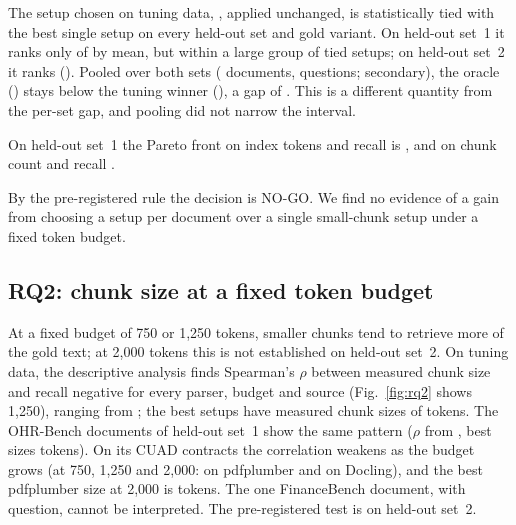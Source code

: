 The setup chosen on tuning data, \RQoneTuningWinner{}, applied unchanged, is
statistically tied with the best single setup on every held-out set and gold
variant. On held-out set~1 it ranks only \RQoneTuningWinnerRank{} of
\RQoneSetups{} by mean, but within a large group of tied setups; on held-out
set~2 it ranks \RQoneHTwoDropRuleTuningWinnerRank{}
(\RQoneHTwoDropRuleTuningWinnerRecall{}).
Pooled over both sets (\RQonePooledDocuments{} documents,
\RQonePooledQuestions{} questions; secondary), the oracle
(\RQonePooledOracle{}) stays below the tuning winner
(\RQonePooledTuningWinnerRecall{}), a gap of \RQonePooledGap{}
\RQonePooledGapCI{}. This is a different quantity from the per-set gap, and
pooling did not narrow the interval.

On held-out set~1 the Pareto front on index tokens and recall is
\RQoneParetoTokens{}, and on chunk count and recall \RQoneParetoChunks{}.

By the pre-registered rule the decision is NO-GO. We find no evidence of a gain
from choosing a setup per document over a single small-chunk setup under a
fixed token budget.

\subsection{RQ2: chunk size at a fixed token budget}\label{sec:rq2}




At a fixed budget of 750 or 1,250 tokens, smaller chunks tend to retrieve more
of the gold text; at 2,000 tokens this is not established on held-out set~2. On
tuning data, the descriptive analysis finds Spearman's $\rho$ between measured
chunk size and recall negative for every parser, budget and source
(Fig.~\ref{fig:rq2} shows 1,250), ranging from \RQtwoRhoRange{}; the best setups have
measured chunk sizes of \RQtwoBestSizes{} tokens. The OHR-Bench documents of
held-out set~1 show the same pattern ($\rho$ from \RQtwoHeldOutOHRRhoRange{},
best sizes \RQtwoHeldOutOHRBestSizes{} tokens). On its
\RQtwoHeldOutCUADDocuments{} CUAD contracts the correlation weakens as the budget
grows (at 750, 1,250 and 2,000: \RQtwoHeldOutCUADPdfplumberRhos{} on pdfplumber
and \RQtwoHeldOutCUADDoclingRhos{} on Docling), and the best pdfplumber size at
2,000 is \RQtwoHeldOutCUADPdfplumberLargestBestSize{} tokens. The one
FinanceBench document, with \FinanceBenchKept{} question, cannot be interpreted.
The pre-registered test is on held-out set~2.

